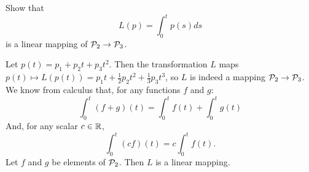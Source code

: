 \documentclass{ximera}
\begin{document}
\begin{exercise}  \label{c7.2.2b}
Show that
\[
L(p) = \int_0^tp(s)ds
\]
is a linear mapping of ${\cal P}_2\to{\cal P}_3$.

\begin{solution}

\soln
Let $p(t) = p_1 + p_2t + p_3t^2$.  Then the transformation $L$
maps $p(t) \mapsto L(p(t)) = p_1t + \frac{1}{2}p_2t^2 +
\frac{1}{3}p_3t^3$, so $L$ is indeed a mapping ${\cal P}_2
\rightarrow {\cal P}_3$.  We know from calculus that, for any
functions $f$ and $g$:
\[ \int_0^t(f + g)(t) = \int_0^tf(t) + \int_0^tg(t) \]
And, for any scalar $c \in \mbox{$\mathbb{R}$}$,
\[ \int_0^t(cf)(t) = c\int_0^tf(t). \]
Let $f$ and $g$ be elements of ${\cal P}_2$.  Then $L$ is a linear
mapping.

\end{solution}
\end{exercise}
\end{document}
